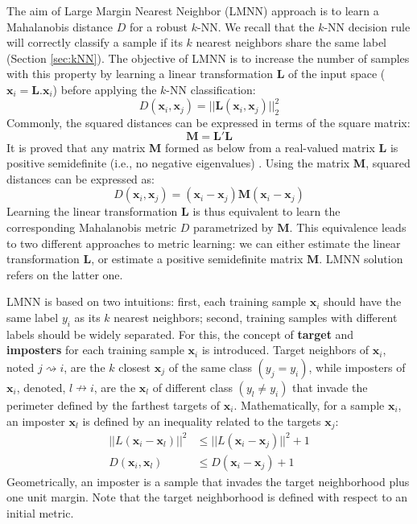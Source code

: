 The aim of Large Margin Nearest Neighbor (LMNN) approach is to learn a Mahalanobis distance $D$ for a robust $k$-NN. We recall that the $k$-NN decision rule will correctly classify a sample if its $k$ nearest neighbors share the same label (Section \ref{sec:kNN}). The objective of LMNN is to increase the number of samples with this property by learning a linear transformation $\textbf{L}$ of the input space ($\textbf{x}_i=\textbf{L}.\textbf{x}_i$) before applying the $k$-NN classification:
\begin{equation}
	D(\textbf{x}_i,\textbf{x}_j) = ||\textbf{L}(\textbf{x}_i,\textbf{x}_j)||_2^2
	\label{eq:lin}
\end{equation}
\noindent Commonly, the squared distances can be expressed in terms of the square matrix:
\begin{equation}
\textbf{M} = \textbf{L}'\textbf{L}
\end{equation}
It is proved that any matrix \textbf{M} formed as below from a real-valued matrix \textbf{L} is positive semidefinite (i.e., no negative eigenvalues) \cite{Weinberger2009}. Using the matrix \textbf{M}, squared distances can be expressed as:
\begin{equation}
D(\textbf{x}_i,\textbf{x}_j) = (\textbf{x}_i-\textbf{x}_j)\textbf{M}(\textbf{x}_i-\textbf{x}_j)
\end{equation}
Learning the linear transformation $\textbf{L}$ is thus equivalent to learn the corresponding Mahalanobis metric $D$ parametrized by $\textbf{M}$. This equivalence leads to two different approaches to metric learning: we can either estimate the linear transformation $\textbf{L}$, or estimate a positive semidefinite matrix $\textbf{M}$. LMNN solution refers on the latter one.

LMNN is based on two intuitions: first, each training sample $\textbf{x}_i$ should have the same label $y_i$ as its $k$ nearest neighbors; second, training samples with different labels should be widely separated. For this, the concept of \textbf{target} and \textbf{imposters} for each training sample $\textbf{x}_i$ is introduced. Target neighbors of $\textbf{x}_i$, noted $j \rightsquigarrow i$, are the $k$ closest $\textbf{x}_j$ of the same class $(y_j=y_i)$, while imposters of $\textbf{x}_i$, denoted, $l \nrightarrow i$, are the $\textbf{x}_l$ of different class $(y_l \neq y_i)$ that invade the perimeter defined by the farthest targets of $\textbf{x}_i$. 
Mathematically, for a sample $\textbf{x}_i$, an imposter $\textbf{x}_l$ is defined by an inequality related to the targets $\textbf{x}_j$:
\begin{align}
||L(\textbf{x}_i-\textbf{x}_l)||^2 & \leq ||L(\textbf{x}_i-\textbf{x}_j)||^2 + 1 \\
D(\textbf{x}_i,\textbf{x}_l) &\leq D(\textbf{x}_i-\textbf{x}_j) + 1
\end{align}
Geometrically, an imposter is a sample that invades the target neighborhood plus one unit margin. Note that the target neighborhood is defined with respect to an initial metric.

